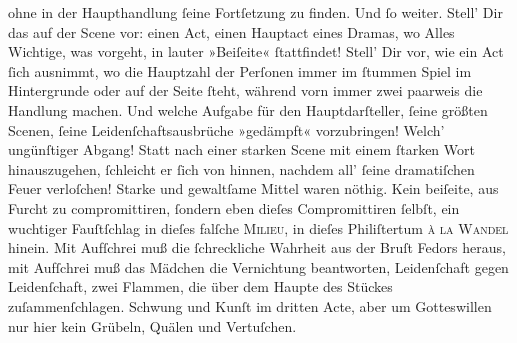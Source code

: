                ohne in der Haupthandlung ſeine Fortſetzung zu finden. Und ſo weiter. Stell’ Dir das
               auf der Scene vor: einen Act, einen Hauptact eines Dramas, wo Alles Wichtige, was
               vorgeht, in lauter »Beiſeite« ſtattfindet! Stell’ Dir vor, wie ein Act ſich ausnimmt,
               wo  die Haupt\strikeout{\textcolor{gray}{h}}zahl der Perſonen immer im ſtummen Spiel im Hintergrunde oder auf der Seite
               ſteht, während vorn immer zwei paarweis {\pb}die
               Handlung machen. Und welche Aufgabe für den Hauptdarſteller, ſeine größten Scenen,
               ſeine Leidenſchaftsausbrüche »gedämpft« vorzubringen! Welch’ ungünſtiger Abgang!
               Statt nach einer starken Scene mit einem ſtarken Wort hinauszugehen, ſchleicht er
               ſich von hinnen, nachdem all’ ſeine dramatiſchen Feuer verloſchen! Starke und
               gewaltſame Mittel waren nöthig. Kein beiſeite, aus Furcht zu compromittiren, ſondern
               eben dieſes Compromittiren ſelbſt, ein wuchtiger Fauſtſchlag \strikeout{\textcolor{gray}{×}\-\textcolor{gray}{×}\-\textcolor{gray}{×}} in dieſes falſche \textsc{Milieu}, in dieſes Philiſtertum \textsc{à la Wandel} hinein. Mit Aufſchrei muß die ſchreckliche Wahrheit aus der Bruſt Fedors heraus, mit Aufſchrei
               muß das Mädchen die Vernichtung beantworten, Leidenſchaft gegen Leidenſchaft, zwei
               Flammen, die über dem Haupte des Stückes zuſammenſchlagen. Schwung und Kunſt im dritten Acte, aber {\pb}um Gotteswillen nur hier kein Grübeln, Quälen und Vertuſchen.\pend
           
